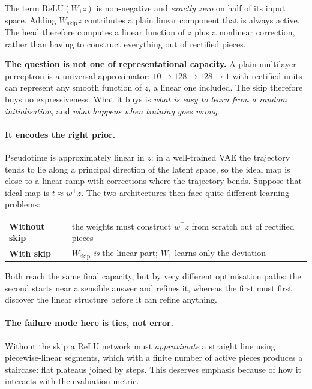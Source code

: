 \documentclass[11pt,a4paper]{article}
\newenvironment{keybox}{\begin{shaded}\noindent}{\end{shaded}}
\theoremstyle{definition}
\begin{document}
The term $\mathrm{ReLU}(W_1 z)$ is non-negative and \emph{exactly zero} on half
of its input space. Adding $W_{\text{skip}} z$ contributes a plain linear
component that is always active. The head therefore computes a linear function
of $z$ plus a nonlinear correction, rather than having to construct everything
out of rectified pieces.

\begin{keybox}
\textbf{The question is not one of representational capacity.} A plain
multilayer perceptron is a universal approximator: $10 \to 128 \to 128 \to 1$
with rectified units can represent any smooth function of $z$, a linear one
included. The skip therefore buys no expressiveness. What it buys is
\emph{what is easy to learn from a random initialisation}, and \emph{what
happens when training goes wrong}.
\end{keybox}

\paragraph{It encodes the right prior.} Pseudotime is approximately linear in
$z$: in a well-trained VAE the trajectory tends to lie along a principal
direction of the latent space, so the ideal map is close to a linear ramp with
corrections where the trajectory bends. Suppose that ideal map is
$t \approx w^{\!\top} z$. The two architectures then face quite different
learning problems:

\begin{center}
\begin{tabular}{@{}ll@{}}
\toprule
\textbf{Without skip} & the weights must construct $w^{\!\top} z$ from scratch out of rectified pieces \\
\textbf{With skip}    & $W_{\text{skip}}$ \emph{is} the linear part; $W_1$ learns only the deviation \\
\bottomrule
\end{tabular}
\end{center}

Both reach the same final capacity, but by very different optimisation paths:
the second starts near a sensible answer and refines it, whereas the first must
first discover the linear structure before it can refine anything.

\paragraph{The failure mode here is ties, not error.} Without the skip a ReLU
network must \emph{approximate} a straight line using piecewise-linear
segments, which with a finite number of active pieces produces a staircase:
flat plateaus joined by steps. This deserves emphasis because of how it
interacts with the evaluation metric.
\end{document}
